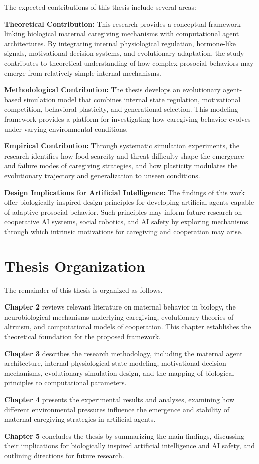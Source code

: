 The expected contributions of this thesis include several areas:

\textbf{Theoretical Contribution:}
This research provides a conceptual framework linking biological maternal caregiving mechanisms with computational agent architectures. By integrating internal physiological regulation, hormone-like signals, motivational decision systems, and evolutionary adaptation, the study contributes to theoretical understanding of how complex prosocial behaviors may emerge from relatively simple internal mechanisms.

\textbf{Methodological Contribution:}
The thesis develops an evolutionary agent-based simulation model that combines internal state regulation, motivational competition, behavioral plasticity, and generational selection. This modeling framework provides a platform for investigating how caregiving behavior evolves under varying environmental conditions.

\textbf{Empirical Contribution:}
Through systematic simulation experiments, the research identifies how food scarcity and threat difficulty shape the emergence and failure modes of caregiving strategies, and how plasticity modulates the evolutionary trajectory and generalization to unseen conditions.

\textbf{Design Implications for Artificial Intelligence:}
The findings of this work offer biologically inspired design principles for developing artificial agents capable of adaptive prosocial behavior. Such principles may inform future research on cooperative AI systems, social robotics, and AI safety by exploring mechanisms through which intrinsic motivations for caregiving and cooperation may arise.

\section{Thesis Organization}

The remainder of this thesis is organized as follows.

\textbf{Chapter 2} reviews relevant literature on maternal behavior in biology, the neurobiological mechanisms underlying caregiving, evolutionary theories of altruism, and computational models of cooperation. This chapter establishes the theoretical foundation for the proposed framework.

\textbf{Chapter 3} describes the research methodology, including the maternal agent architecture, internal physiological state modeling, motivational decision mechanisms, evolutionary simulation design, and the mapping of biological principles to computational parameters.

\textbf{Chapter 4} presents the experimental results and analyses, examining how different environmental pressures influence the emergence and stability of maternal caregiving strategies in artificial agents.

\textbf{Chapter 5} concludes the thesis by summarizing the main findings, discussing their implications for biologically inspired artificial intelligence and AI safety, and outlining directions for future research.